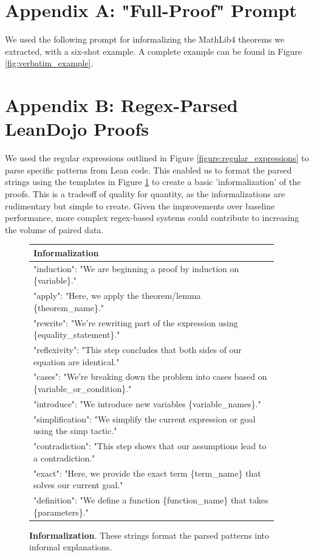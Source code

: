 \documentclass{article} %
\begin{document}
\section{Appendix A: "Full-Proof" Prompt}
We used the following prompt for informalizing the MathLib4 theorems we extracted, with a six-shot example. A complete example can be found in Figure \ref{fig:verbatim_example}.


\section{Appendix B: Regex-Parsed LeanDojo Proofs} 
We used the regular expressions outlined in Figure \ref{figure:regular_expressions} to parse specific patterns from Lean code. This enabled us to format the parsed strings using the templates in Figure \ref{figure:naive_regex_informalization} to create a basic 'informalization' of the proofs. This is a tradeoff of quality for quantity, as the informalizations are rudimentary but simple to create. Given the improvements over baseline performance, more complex regex-based systems could contribute to increasing the volume of paired data.

\begin{figure}[ht]
\centering
\begin{tabular}{|p{0.95\linewidth}|}
\hline
\textbf{Informalization} \\
\hline
"induction": "We are beginning a proof by induction on \{variable\}." \\
"apply": "Here, we apply the theorem/lemma \{theorem\_name\}." \\
"rewrite": "We're rewriting part of the expression using \{equality\_statement\}." \\
"reflexivity": "This step concludes that both sides of our equation are identical." \\
"cases": "We're breaking down the problem into cases based on \{variable\_or\_condition\}." \\
"introduce": "We introduce new variables \{variable\_names\}." \\
"simplification": "We simplify the current expression or goal using the simp tactic." \\
"contradiction": "This step shows that our assumptions lead to a contradiction." \\
"exact": "Here, we provide the exact term \{term\_name\} that solves our current goal." \\
"definition": "We define a function \{function\_name\} that takes \{parameters\}." \\
\hline
\end{tabular}
\caption{\textbf{Informalization}. These strings format the parsed patterns into informal explanations.}
\label{figure:naive_regex_informalization}
\end{figure}
\end{document}
